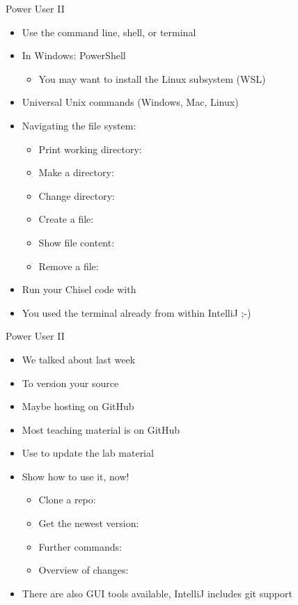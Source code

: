 \begin{frame}[fragile]{Power User II}
\begin{itemize}
\item Use the command line, shell, or terminal
\item In Windows: PowerShell
\begin{itemize}
\item You may want to install the Linux subsystem (WSL)
\end{itemize}
\item Universal Unix commands (Windows, Mac, Linux)
\item Navigating the file system:
\begin{itemize}
\item Print working directory: 
\item Make a directory: 
\item Change directory: 
\item Create a file: 
\item Show file content: 
\item Remove a file: 
\end{itemize}
\item Run your Chisel code with 
\item You used the terminal already from within IntelliJ ;-)
\end{itemize}
\end{frame}

\begin{frame}[fragile]{Power User II}
\begin{itemize}
\item We talked about  last week
\item To version your source
\item Maybe hosting on GitHub
\item Most teaching material is on GitHub
\item Use  to update the lab material
\item Show how to use it, now!
\begin{itemize}
\item Clone a repo: 
\item Get the newest version: 
\item Further commands: 
\item Overview of changes: 
\end{itemize}
\item There are also GUI tools available, IntelliJ includes git support
\end{itemize}
\end{frame}




